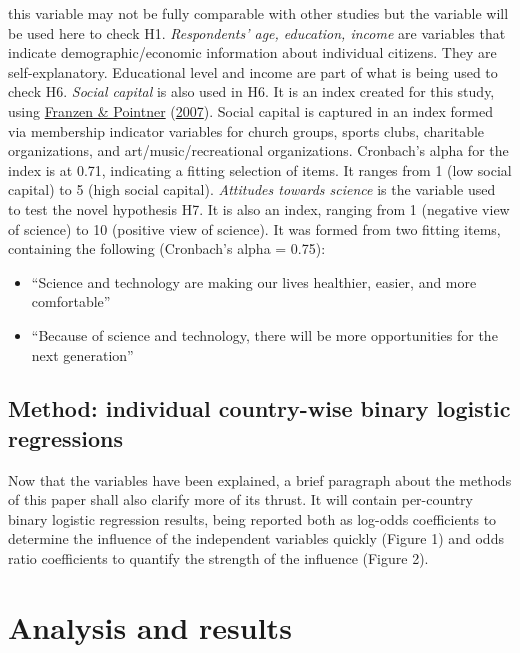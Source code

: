\documentclass[
  12pt,
  english,
]{article}
\providecommand{\tightlist}{%
  \setlength{\itemsep}{0pt}\setlength{\parskip}{0pt}}
\begin{document}
this variable may not be fully comparable with other studies but the
variable will be used here to check H1. \emph{Respondents' age,
education, income} are variables that indicate demographic/economic
information about individual citizens. They are self-explanatory.
Educational level and income are part of what is being used to check H6.
\emph{Social capital} is also used in H6. It is an index created for
this study, using
\protect\hyperlink{ref-franzen2007sozialkapital}{Franzen \& Pointner}
(\protect\hyperlink{ref-franzen2007sozialkapital}{2007}). Social capital
is captured in an index formed via membership indicator variables for
church groups, sports clubs, charitable organizations, and
art/music/recreational organizations. Cronbach's alpha for the index is
at 0.71, indicating a fitting selection of items. It ranges from 1 (low
social capital) to 5 (high social capital). \emph{Attitudes towards
science} is the variable used to test the novel hypothesis H7. It is
also an index, ranging from 1 (negative view of science) to 10 (positive
view of science). It was formed from two fitting items, containing the
following (Cronbach's alpha = 0.75):

\begin{itemize}
\tightlist
\item
  ``Science and technology are making our lives healthier, easier, and
  more comfortable''
\item
  ``Because of science and technology, there will be more opportunities
  for the next generation''
\end{itemize}

\hypertarget{method-individual-country-wise-binary-logistic-regressions}{%
\subsection{Method: individual country-wise binary logistic
regressions}\label{method-individual-country-wise-binary-logistic-regressions}}

Now that the variables have been explained, a brief paragraph about the
methods of this paper shall also clarify more of its thrust. It will
contain per-country binary logistic regression results, being reported
both as log-odds coefficients to determine the influence of the
independent variables quickly (Figure 1) and odds ratio coefficients to
quantify the strength of the influence (Figure 2).

\hypertarget{analysis-and-results}{%
\section{Analysis and results}\label{analysis-and-results}}
\end{document}
